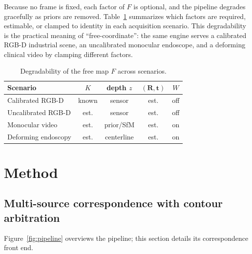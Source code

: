 \documentclass[9pt,twoside,web]{ieeecolor2}
\begin{document}
Because no frame is fixed, each factor of $F$ is optional, and the pipeline degrades gracefully as priors are removed. Table~\ref{tab:degrade} summarizes which factors are required, estimable, or clamped to identity in each acquisition scenario. This degradability is the practical meaning of ``free-coordinate'': the same engine serves a calibrated RGB-D industrial scene, an uncalibrated monocular endoscope, and a deforming clinical video by clamping different factors.

\begin{table}[t]
\centering
\caption{Degradability of the free map $F$ across scenarios.}
\label{tab:degrade}
\begin{tabular}{lcccc}
\toprule
Scenario & $K$ & depth $z$ & $(\mathbf{R},\mathbf{t})$ & $W$ \\
\midrule
Calibrated RGB-D & known & sensor & est. & off \\
Uncalibrated RGB-D & est. & sensor & est. & off \\
Monocular video & est. & prior/SfM & est. & on \\
Deforming endoscopy & est. & centerline & est. & on \\
\bottomrule
\end{tabular}
\end{table}

\section{Method}\label{sec:method}

\subsection{Multi-source correspondence with contour arbitration}\label{sec:engine}
Figure~\ref{fig:pipeline} overviews the pipeline; this section details its correspondence front end.
\end{document}

